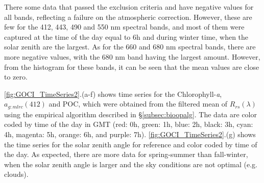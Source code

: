 \documentclass[onecolumn,3p,letterpaper,11pt]{elsarticle}
\begin{document}
There some data that passed the exclusion criteria and have negative values for all bands, reflecting a failure on the atmospheric correction. However, these are few for the 412, 443, 490 and 550 nm spectral bands, and most of them were captured at the time of the day equal to 6h and during winter time, when the solar zenith are the largest. As for the 660 and 680 nm spectral bands, there are more negative values, with the 680 nm band having the largest amount. However, from the histogram for these bands, it can be seen that the mean values are close to zero.

\autoref{fig:GOCI_TimeSeries2}.(a-f) shows time series for the Chlorophyll-{\it a}, $a_{g:mlrc}(412)$ and POC, which were obtained from the filtered mean of $R_{rs}(\lambda)$ using the empirical algorithm described in \S\ref{subsec:bioopalg}.  The data are color coded by time of the day in GMT (red: 0h, green: 1h, blue: 2h, black: 3h, cyan: 4h, magenta: 5h, orange: 6h, and purple: 7h). \autoref{fig:GOCI_TimeSeries2}.(g) shows the time series for the solar zenith angle for reference and color coded by time of the day. As expected, there are more data for spring-summer than fall-winter, when the solar zenith angle is larger and the sky conditions are not optimal (e.g. clouds).
\end{document}
